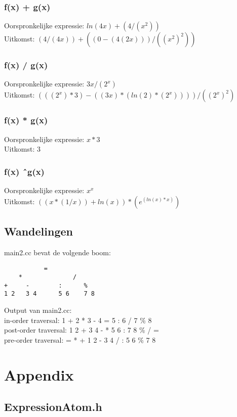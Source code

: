 \documentclass[a4paper,10pt]{article}
\begin{document}
\subsubsection*{f(x) + g(x)}
Oorspronkelijke expressie: $ln(4x) + (4/( x^2))$ \\
Uitkomst: $(4/(4x))+((0-(4(2x)))/((x^2)^2))$

\subsubsection*{f(x) / g(x)}
Oorspronkelijke expressie: $3x/(2^x)$ \\
Uitkomst: $(((2^x)*3)-((3x)*(ln(2)*(2^x))))/((2^x)^2)$

\subsubsection*{f(x) * g(x)}
Oorspronkelijke expressie: $x * 3$ \\
Uitkomst: $3$

\subsubsection*{f(x) \^\ g(x)}
Oorspronkelijke expressie: $x ^ x$ \\
Uitkomst: $((x*(1/x))+ln(x))*(e^{(ln(x)*x)})$

\subsection*{Wandelingen}
main2.cc bevat de volgende boom:
\begin{verbatim}
           =
    *              /
+     -        :      %
1 2   3 4      5 6    7 8
\end{verbatim}


\noindent Output van main2.cc: \\

\noindent in-order traversal: 1 + 2 * 3 - 4 = 5 : 6 / 7 \% 8 \\ 
post-order traversal: 1 2 + 3 4 - * 5 6 : 7 8 \% / = \\
pre-order traversal: = * + 1 2 - 3 4 / : 5 6 \% 7 8

\section*{Appendix}

\subsection*{ExpressionAtom.h}

\end{document}
